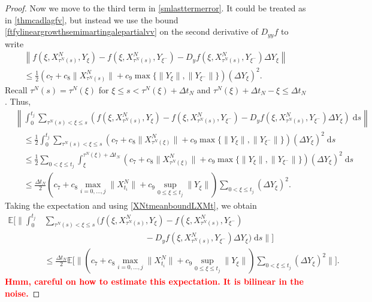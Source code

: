 \documentclass[reqno,12pt]{amsart}
\theoremstyle{plain} %
\theoremstyle{definition} %
\newcommand{\comment}[1]{\textcolor{red}{\textbf{#1}}}
\begin{document}
\begin{proof}
    Now we move to the third term in \eqref{smlasttermerror}. It could be treated as in \cref{thmcadlagfv}, but instead we use the bound \eqref{ftfylineargrowthsemimartingalepartialvv} on the second derivative of $D_{yy}f$ to write
    \begin{multline*}
        \left\| f(\xi, X_{\tau^N(s)}^N, Y_\xi) - f(\xi, X_{\tau^N(s)}^N, Y_{\xi^{-}}) - D_y f(\xi, X_{\tau^N(s)}^N, Y_{\xi^-}) \Delta Y_\xi \right\| \\
        \leq \frac{1}{2}\left(c_7 + c_8 \|X_{\tau^N(s)}^N\| + c_9 \max\{\|Y_\xi\|, \|Y_{\xi^-}\|\} \right)\left( \Delta Y_\xi \right)^2.
    \end{multline*}
    Recall $\tau^N(s) = \tau^N(\xi)$ for $\xi \leq s < \tau^N(\xi) + \Delta t_N$ and $\tau^N(\xi) + \Delta t_N- \xi \leq \Delta t_N$. Thus,
    \begin{align*}
        & \left\|\int_0^{t_j} \sum_{\tau^N(s) < \xi \leq s} \left(f(\xi, X_{\tau^N(s)}^N, Y_\xi) - f(\xi, X_{\tau^N(s)}^N, Y_{\xi^{-}}) - D_y f(\xi, X_{\tau^N(s)}^N, Y_{\xi^-})\Delta Y_\xi\right) \;\mathrm{d}s\right\| \\
        & \quad \leq \frac{1}{2}\int_0^{t_j} \sum_{\tau^N(s) < \xi \leq s} \left(c_7 + c_8 \|X_{\tau^N(\xi)}^N\| + c_9 \max\{\|Y_\xi\|, \|Y_{\xi^-}\|\} \right)\left( \Delta Y_\xi \right)^2\;\mathrm{d}s \\
        & \quad \leq \frac{1}{2}\sum_{0 < \xi \leq t_j}\int_\xi^{\tau^N(\xi) + \Delta t_N} \left(c_7 + c_8 \|X_{\tau^N(\xi)}^N\| + c_9 \max\{\|Y_\xi\|, \|Y_{\xi^-}\|\} \right)\left( \Delta Y_\xi \right)^2\;\mathrm{d}s \\
        & \quad \leq \frac{\Delta t_N}{2} \left( c_7 + c_8 \max_{i=0, \ldots, j}\|X_{t_i}^N\| + c_9 \sup_{0\leq \xi \leq t_j}\|Y_\xi\|\right) \sum_{0 < \xi \leq t_j}\left( \Delta Y_\xi \right)^2.
    \end{align*}
    Taking the expectation and using \eqref{XNtmeanboundLXMt}, we obtain
    \begin{align*}
        \mathbb{E}\Bigg[\Bigg\|\int_0^{t_j} & \sum_{\tau^N(s) < \xi \leq s} \bigg(f(\xi, X_{\tau^N(s)}^N, Y_\xi) - f(\xi, X_{\tau^N(s)}^N, Y_{\xi^{-}}) \\
        & \hspace{2in} - D_y f(\xi, X_{\tau^N(s)}^N, Y_{\xi^-})\Delta Y_\xi\bigg) \;\mathrm{d}s\Bigg\|\Bigg] \\
        & \leq \frac{\Delta t_N}{2} \mathbb{E}\Bigg[\Bigg\|\left( c_7 + c_8 \max_{i=0, \ldots, j}\|X_{t_i}^N\| + c_9 \sup_{0\leq \xi \leq t_j}\|Y_\xi\|\right) \sum_{0 < \xi \leq t_j}\left( \Delta Y_\xi \right)^2\Bigg\|\Bigg].
    \end{align*}
    \comment{Hmm, careful on how to estimate this expectation. It is bilinear in the noise.}


\end{proof}
\end{document}
